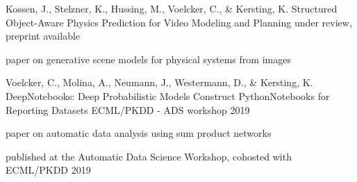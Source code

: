 

\begin{cventries}

  \cventry
    {Kossen, J., Stelzner, K., Hussing, M., Voelcker, C., \& Kersting, K.} %
    {Structured Object-Aware Physics Prediction for Video Modeling and Planning} %
    {under review, preprint available} %
    {} %
    {
      \begin{cvitems} %
        \item {paper on generative scene models for physical systems from images}
      \end{cvitems}
    }

  \cventry
    {Voelcker, C., Molina, A., Neumann, J., Westermann, D., \& Kersting, K.} %
    {DeepNotebooks: Deep Probabilistic Models Construct PythonNotebooks for Reporting Datasets} %
    {ECML/PKDD - ADS workshop 2019} %
    {} %
    {
      \begin{cvitems} %
        \item {paper on automatic data analysis using sum product networks}
        \item {published at the Automatic Data Science Workshop, cohosted with ECML/PKDD 2019}
      \end{cvitems}
    }


\end{cventries}



